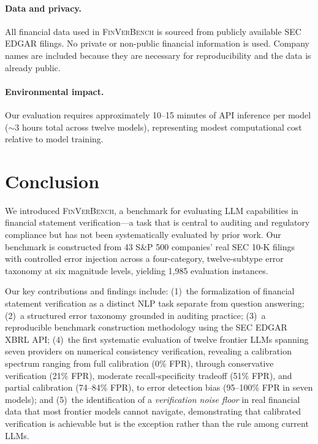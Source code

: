 \documentclass[11pt]{article}
\newcommand{\benchmark}{\textsc{FinVerBench}}
\begin{document}
\paragraph{Data and privacy.}
All financial data used in \benchmark{} is sourced from publicly available SEC EDGAR filings.
No private or non-public financial information is used.
Company names are included because they are necessary for reproducibility and the data is already public.

\paragraph{Environmental impact.}
Our evaluation requires approximately 10--15 minutes of API inference per model ($\sim$3 hours total across twelve models), representing modest computational cost relative to model training.

\section{Conclusion}
\label{sec:conclusion}

We introduced \benchmark{}, a benchmark for evaluating LLM capabilities in financial statement verification---a task that is central to auditing and regulatory compliance but has not been systematically evaluated by prior work.
Our benchmark is constructed from 43 S\&P 500 companies' real SEC 10-K filings with controlled error injection across a four-category, twelve-subtype error taxonomy at six magnitude levels, yielding 1,985 evaluation instances.

Our key contributions and findings include:
(1)~the formalization of financial statement verification as a distinct NLP task separate from question answering;
(2)~a structured error taxonomy grounded in auditing practice;
(3)~a reproducible benchmark construction methodology using the SEC EDGAR XBRL API;
(4)~the first systematic evaluation of twelve frontier LLMs spanning seven providers on numerical consistency verification, revealing a calibration spectrum ranging from full calibration (0\% FPR), through conservative verification (21\% FPR), moderate recall-specificity tradeoff (51\% FPR), and partial calibration (74--84\% FPR), to error detection bias (95--100\% FPR in seven models);
and (5)~the identification of a \emph{verification noise floor} in real financial data that most frontier models cannot navigate, demonstrating that calibrated verification is achievable but is the exception rather than the rule among current LLMs.
\end{document}
